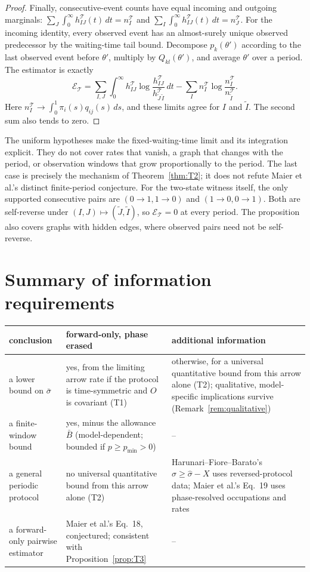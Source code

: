 \documentclass[10pt]{article}
\theoremstyle{definition}
\newcommand{\per}{\mathcal T}
\newcommand{\sbar}{\bar\sigma}
\newcommand{\Bbar}{\bar B}
\begin{document}
\begin{proof}
Finally, consecutive-event counts have equal incoming and outgoing
marginals:
\(\sum_J\int_0^\infty h^\per_{IJ}(t)\,dt=n_I^\per\) and
\(\sum_I\int_0^\infty h^\per_{IJ}(t)\,dt=n_J^\per\).
For the incoming identity, every observed event has an almost-surely
unique observed predecessor by the waiting-time tail bound. Decompose
\(p_k(\theta')\) according to the last observed event before \(\theta'\),
multiply by \(Q_{kl}(\theta')\), and average \(\theta'\) over a period.
The estimator is exactly
\[
\mathcal E_\per
=\sum_{I,J}\int_0^\infty h^\per_{IJ}
 \log\frac{h^\per_{IJ}}{h^\per_{\widetilde J\,\widetilde I}}\,dt
-\sum_I n_I^\per\log\frac{n_I^\per}{n_{\widetilde I}^\per}.
\]
Here \(n_I^\per\to\int_0^1\pi_i(s)q_{ij}(s)\,ds\), and these limits
agree for \(I\) and \(\widetilde I\). The second sum also tends to zero.
\end{proof}

The uniform hypotheses make the fixed-waiting-time limit and its
integration explicit. They do not cover rates that vanish, a graph that
changes with the period, or observation windows that grow proportionally
to the period. The last case is precisely the mechanism of
Theorem~\ref{thm:T2}; it does not refute Maier et al.'s distinct
finite-period conjecture.
For the two-state witness itself, the only supported consecutive pairs are
\((0\!\to\!1,1\!\to\!0)\) and \((1\!\to\!0,0\!\to\!1)\).
Both are self-reverse under \((I,J)\mapsto(\widetilde J,\widetilde I)\),
so \(\mathcal E_\per=0\) at every period. The proposition also covers
graphs with hidden edges, where observed pairs need not be self-reverse.

\section{Summary of information requirements}
\label{sec:T4}

\begin{center}
\begin{tabular}{@{}L{4.2cm}L{5.4cm}L{5.4cm}@{}}
\toprule
conclusion & forward-only, phase erased & additional information\\
\midrule
a lower bound on $\sbar$ & yes, from the limiting arrow rate if the protocol is time-symmetric and
$O$ is covariant (T1) & otherwise, for a universal quantitative bound
from this arrow alone (T2); qualitative, model-specific implications
survive (Remark~\ref{rem:qualitative})\\
a finite-window bound & yes, minus the allowance $\Bbar$
(model-dependent; bounded if $p\geq p_{\min}>0$) & --\\
a general periodic protocol & no universal quantitative bound from this
arrow alone (T2) & Harunari--Fiore--Barato's
$\sigma\geq\hat\sigma-X$ uses reversed-protocol data; Maier et al.'s Eq.~19 uses phase-resolved occupations and rates\\
a forward-only pairwise estimator & Maier et al.'s Eq.~18, conjectured;
consistent with Proposition~\ref{prop:T3} & --\\
\bottomrule
\end{tabular}
\end{center}
\end{document}
